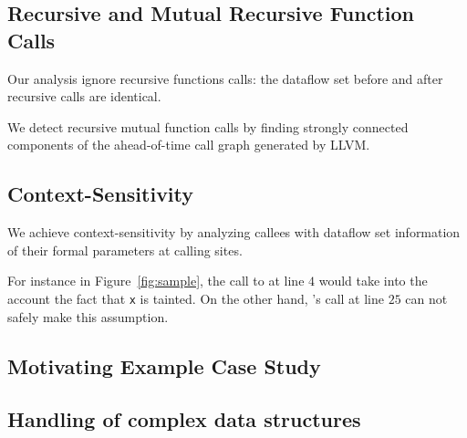 \subsection{Recursive and Mutual Recursive Function Calls} 

Our analysis ignore recursive functions calls: the dataflow set
before and after recursive calls are identical. 

We detect recursive mutual function calls by finding strongly
connected components of the ahead-of-time call graph generated
by LLVM. 

\subsection{Context-Sensitivity} 

We achieve context-sensitivity by analyzing callees
with dataflow set information of their formal parameters
at calling sites.

For instance in Figure~\ref{fig:sample}, the call to \even{} at
line $4$ would take into the account the fact that \texttt{x}
is tainted.
On the other hand, \even{}'s call at line $25$ can not safely
make this assumption.

\subsection{Motivating Example Case Study}\label{sec:sampleSummary}

\subsection{Handling of complex data structures}
